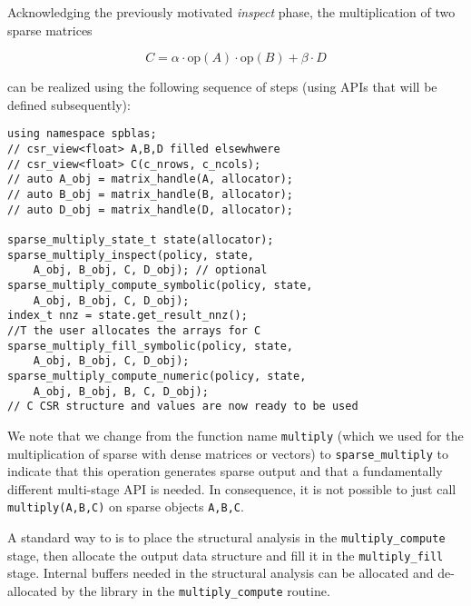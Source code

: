 \documentclass{article}
\newcommand{\fb}[1]{\todo[color=green!30]{\footnotesize #1}}
\begin{document}
Acknowledging the previously motivated \textit{inspect} phase, the multiplication of two sparse matrices 

\begin{equation*}
C = \alpha \cdot \text{op}(A) \cdot \text{op}(B) + \beta \cdot D
\end{equation*}

can be realized using the following sequence of steps (using APIs that will be defined subsequently):
\begin{verbatim}
using namespace spblas;
// csr_view<float> A,B,D filled elsewhwere
// csr_view<float> C(c_nrows, c_ncols);
// auto A_obj = matrix_handle(A, allocator);
// auto B_obj = matrix_handle(B, allocator);
// auto D_obj = matrix_handle(D, allocator);

sparse_multiply_state_t state(allocator);
sparse_multiply_inspect(policy, state, 
    A_obj, B_obj, C, D_obj); // optional
sparse_multiply_compute_symbolic(policy, state, 
    A_obj, B_obj, C, D_obj);
index_t nnz = state.get_result_nnz();
//T the user allocates the arrays for C
sparse_multiply_fill_symbolic(policy, state, 
    A_obj, B_obj, C, D_obj);
sparse_multiply_compute_numeric(policy, state, 
    A_obj, B_obj, B, C, D_obj);
// C CSR structure and values are now ready to be used
\end{verbatim}
We note that we change from the function name \texttt{multiply} (which we used for the multiplication of sparse with dense matrices or vectors) to \texttt{sparse\_multiply} to indicate that this operation generates sparse output and that a fundamentally different multi-stage API is needed. In consequence, it is not possible to just call \texttt{multiply(A,B,C)} on sparse objects \texttt{A,B,C}.

A standard way to is to place the structural analysis in the \texttt{multiply\_compute} stage, then allocate the output data structure and fill it in the \texttt{multiply\_fill} stage. Internal buffers needed in the structural analysis can be allocated and de-allocated by the library in the \texttt{multiply\_compute} routine. 
\end{document}
